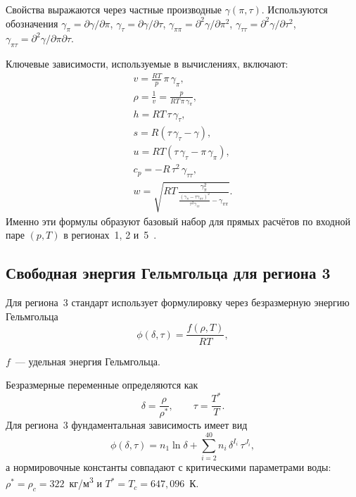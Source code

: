 Свойства выражаются через частные производные $\gamma(\pi,\tau)$.
Используются обозначения
$\gamma_{\pi} = \partial \gamma/\partial \pi$,
$\gamma_{\tau} = \partial \gamma/\partial \tau$,
$\gamma_{\pi\pi} = \partial^{2}\gamma/\partial \pi^{2}$,
$\gamma_{\tau\tau} = \partial^{2}\gamma/\partial \tau^{2}$,
$\gamma_{\pi\tau} = \partial^{2}\gamma/\partial \pi \partial \tau$.

Ключевые зависимости, используемые в вычислениях, включают:
\begin{gather}
v = \frac{R T}{p}\,\pi\,\gamma_{\pi}, \\
\rho = \frac{1}{v} = \frac{p}{R T\,\pi\,\gamma_{\pi}}, \\
h = R T\,\tau\,\gamma_{\tau}, \\
s = R \left(\tau\,\gamma_{\tau} - \gamma\right), \\
u = R T \left(\tau\,\gamma_{\tau} - \pi\,\gamma_{\pi}\right), \\
c_{p} = -R\,\tau^{2}\,\gamma_{\tau\tau}, \\
w = \sqrt{R T\,
\frac{\gamma_{\pi}^{2}}
{\frac{\left(\gamma_{\pi} - \tau\gamma_{\pi\tau}\right)^{2}}
{\tau^{2}\gamma_{\tau\tau}}
- \gamma_{\pi\pi}} }.
\end{gather}
Именно эти формулы образуют базовый набор
для прямых расчётов по входной паре $(p, T)$
в регионах~1, 2 и~5~\cite{iapws_if97_2012}.

\subsection{Свободная энергия Гельмгольца для региона 3}

Для региона~3 стандарт использует формулировку через безразмерную энергию Гельмгольца
\begin{equation}
\phi(\delta, \tau) = \frac{f(\rho, T)}{R T},
\end{equation}
\begin{gostwhere}
  \item $f$~--- удельная энергия Гельмгольца.
\end{gostwhere}

Безразмерные переменные определяются как
\begin{equation}
\delta = \frac{\rho}{\rho^{*}}, \qquad \tau = \frac{T^{*}}{T}.
\end{equation}
Для региона~3 фундаментальная зависимость имеет вид
\begin{equation}
\phi(\delta,\tau) = n_{1}\ln\delta + \sum_{i=2}^{40} n_{i}\,\delta^{I_{i}}\,\tau^{J_{i}},
\end{equation}
а нормировочные константы совпадают
с критическими параметрами воды:
$\rho^{*}=\rho_{c}=322$~кг/м\textsuperscript{3} и $T^{*}=T_{c}=647{,}096$~К.

